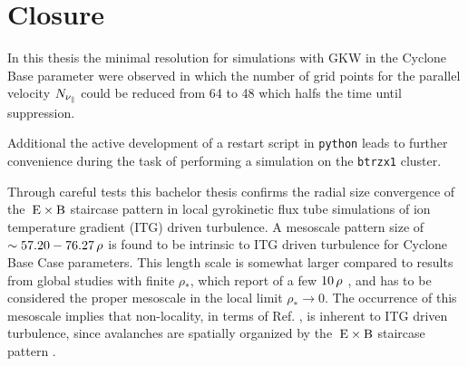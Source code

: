 
\chapter{Closure}
\label{chap:close}

\thispagestyle{empty}
\newpage

In this thesis the minimal resolution for simulations with GKW in the Cyclone Base parameter were observed in which the number of grid points for the parallel velocity $N_{\nu_\parallel}$ could be reduced from 64 to 48 which halfs the time until suppression. \bigskip

Additional the active development of a restart script in \texttt{python} leads to further convenience during the task of performing a simulation on the \texttt{btrzx1} cluster. \bigskip

Through careful tests this bachelor thesis confirms the radial size convergence of the $\mathrm{\:E}\times\mathrm{B}$ staircase pattern in local gyrokinetic flux tube simulations of ion temperature gradient (ITG) driven turbulence.
A mesoscale pattern size of $\sim 57.20 - 76.27\,\rho$ is found to be intrinsic to ITG driven turbulence for Cyclone Base Case parameters.
This length scale is somewhat larger compared to results from global studies with finite $\rho_\ast$, which report of a few $10\,\rho$ \cite{Pradalier2010}, and has to be considered the proper mesoscale in the local limit $\rho_\ast \rightarrow 0$.  
The occurrence of this mesoscale implies that non-locality, in terms of Ref. , is inherent to ITG driven turbulence, since avalanches are spatially organized by the $\mathrm{\:E}\times\mathrm{B}$ staircase pattern \cite{McMillan2009, Pradalier2010, Rath2016, Peeters2016}. 